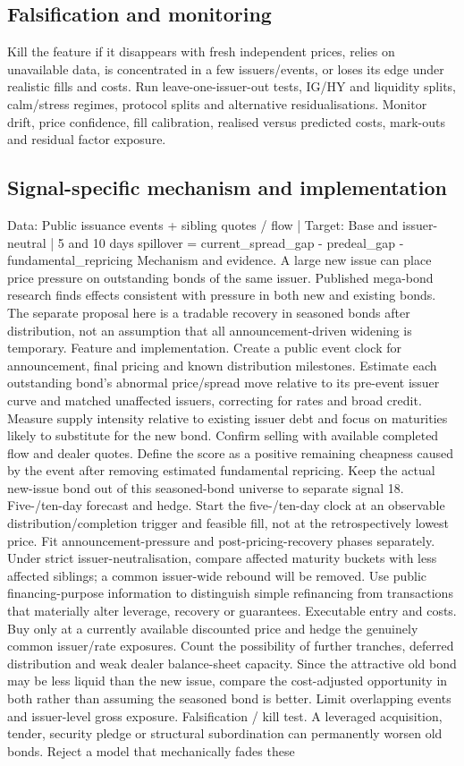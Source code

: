 \documentclass[10pt]{article}
\begin{document}
\subsection{Falsification and monitoring}
Kill the feature if it disappears with fresh independent prices, relies on unavailable data, is concentrated in a few issuers/events, or loses its edge under realistic fills and costs. Run leave-one-issuer-out tests, IG/HY and liquidity splits, calm/stress regimes, protocol splits and alternative residualisations. Monitor drift, price confidence, fill calibration, realised versus predicted costs, mark-outs and residual factor exposure.
\subsection{Signal-specific mechanism and implementation}
Data: Public issuance events + sibling quotes / flow  |  Target: Base and issuer-neutral  |  5 and 10 days spillover = current\_spread\_gap - predeal\_gap - fundamental\_repricing Mechanism and evidence.  A large new issue can place price pressure on outstanding bonds of the same issuer. Published mega-bond research finds effects consistent with pressure in both new and existing bonds. The separate proposal here is a tradable recovery in seasoned bonds after distribution, not an assumption that all announcement-driven widening is temporary. Feature and implementation.  Create a public event clock for announcement, final pricing and known distribution milestones. Estimate each outstanding bond’s abnormal price/spread move relative to its pre-event issuer curve and matched unaffected issuers, correcting for rates and broad credit. Measure supply intensity relative to existing issuer debt and focus on maturities likely to substitute for the new bond. Confirm selling with available completed flow and dealer quotes. Define the score as a positive remaining cheapness caused by the event after removing estimated fundamental repricing. Keep the actual new-issue bond out of this seasoned-bond universe to separate signal 18. Five-/ten-day forecast and hedge.  Start the five-/ten-day clock at an observable distribution/completion trigger and feasible fill, not at the retrospectively lowest price. Fit announcement-pressure and post-pricing-recovery phases separately. Under strict issuer-neutralisation, compare affected maturity buckets with less affected siblings; a common issuer-wide rebound will be removed. Use public financing-purpose information to distinguish simple refinancing from transactions that materially alter leverage, recovery or guarantees. Executable entry and costs.  Buy only at a currently available discounted price and hedge the genuinely common issuer/rate exposures. Count the possibility of further tranches, deferred distribution and weak dealer balance-sheet capacity. Since the attractive old bond may be less liquid than the new issue, compare the cost-adjusted opportunity in both rather than assuming the seasoned bond is better. Limit overlapping events and issuer-level gross exposure. Falsification / kill test.  A leveraged acquisition, tender, security pledge or structural subordination can permanently worsen old bonds. Reject a model that mechanically fades these 
\end{document}

